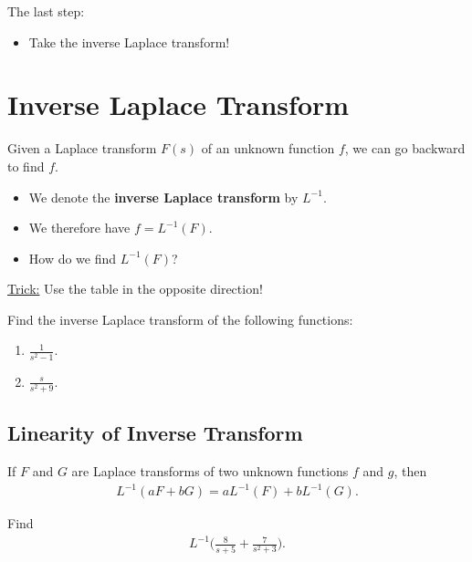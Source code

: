 \documentclass[12pt,a4paper]{article}
\newcounter{example}[section]
\begin{document}
The last step: 
	\begin{itemize}
	\item Take the inverse Laplace transform!
	\end{itemize}
	
	\newpage
	
	\section{Inverse Laplace Transform}
	Given a Laplace transform $F(s)$ of an unknown function $f$, we can go backward to find $f$.
	
		\begin{itemize}
		\item We denote the \textbf{inverse Laplace transform} by $L^{-1}$.
		\item We therefore have $f = L^{-1} (F)$.
		\item How do we find $L^{-1} (F)$?
		\end{itemize}
		
	\underline{Trick:} Use the table in the opposite direction!
		
	\vspace*{16pt}
	
	\begin{example}
	Find the inverse Laplace transform of the following functions:
		\begin{enumerate}[label=\textbf{(\alph*)}]
		\item $\displaystyle \frac{1}{s^2 - 1}$.
		\item $\displaystyle \frac{s}{s^2 + 9}$.
		\end{enumerate}
	\end{example}
	
	\newpage
	
	\subsection{Linearity of Inverse Transform}
	If $F$ and $G$ are Laplace transforms of two unknown functions $f$ and $g$, then
		\begin{align*}
		L^{-1} (aF + bG) = a L^{-1} (F) + b L^{-1} (G) .
		\end{align*}
	
	\begin{example}
	Find
		\begin{align*}
		L^{-1} \Big( \frac{8}{s + 5} + \frac{7}{s^2 + 3} \Big) .
		\end{align*}
	\end{example}
	
\end{document}

